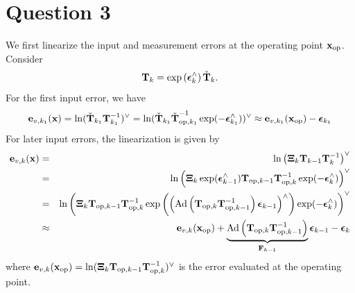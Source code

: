 \documentclass[a4paper]{article}
\begin{document}
\section*{Question 3}

We first linearize the input and measurement errors at the operating point $\bm{\mathbf{x}}_{\text{op}}$. 
Consider 
\begin{equation}
    \bm{\mathbf{T}}_k = \exp\left( \bm{\mathbf{\epsilon}}_k^\wedge \right) \check{\bm{\mathbf{T}}}_k.
\end{equation}
For the first input error, we have
\begin{equation}
    \bm{\mathbf{e}}_{v, k_1}(\bm{\mathbf{x}}) = \ln (\check{\bm{\mathbf{T}}}_{k_1} \bm{\mathbf{T}}^{-1}_{k_1})^\vee = \ln (\check{\bm{\mathbf{T}}}_{k_1} \check{\bm{\mathbf{T}}}^{-1}_{\text{op},k_1} \exp(-\bm{\mathbf{\epsilon}}_{k_1}^\wedge))^\vee \approx \bm{\mathbf{e}}_{v, k_1}(\bm{\mathbf{x}}_{\text{op}}) - \bm{\mathbf{\epsilon}}_{k_1}
\end{equation}
For later input errors, the linearization is given by
\begin{eqnarray}
    \bm{\mathbf{e}}_{v, k}(\bm{\mathbf{x}}) 
     &=& \ln \left(\bm{\mathbf{\Xi}}_k \bm{\mathbf{T}}_{k-1} \bm{\mathbf{T}}_k^{-1}\right)^\vee \\
     &=& \ln \left(\bm{\mathbf{\Xi}}_k \exp (\bm{\mathbf{\epsilon}}_{k-1}^\wedge)\bm{\mathbf{T}}_{\text{op}, k-1} \bm{\mathbf{T}}_{\text{op}, k}^{-1} \exp (-\bm{\mathbf{\epsilon}}_{k}^\wedge) \right)^\vee \\
    &=& \ln \left(\bm{\mathbf{\Xi}}_k \bm{\mathbf{T}}_{\text{op}, k-1} \bm{\mathbf{T}}_{\text{op},k}^{-1} \exp\left( \left( \text{Ad}\left( \bm{\mathbf{T}}_{\text{op}, k} \bm{\mathbf{T}}_{\text{op}, k-1}^{-1}  \right) \bm{\mathbf{\epsilon}}_{k-1} \right)^{\wedge} \right) \exp (-\bm{\mathbf{\epsilon}}_{k}^\wedge) \right)^\vee \\
    &\approx& \bm{\mathbf{e}}_{v, k}(\bm{\mathbf{x}}_{\text{op}}) + \underbrace{\text{Ad}\left( \bm{\mathbf{T}}_{\text{op}, k} \bm{\mathbf{T}}^{-1}_{\text{op}, k-1} \right)}_{\bm{\mathbf{F}}_{k-1}} \bm{\mathbf{\epsilon}}_{k-1} - \bm{\mathbf{\epsilon}}_{k}
\end{eqnarray}
where $\bm{\mathbf{e}}_{v, k}(\bm{\mathbf{x}}_{\text{op}}) = \ln (\bm{\mathbf{\Xi}}_k \bm{\mathbf{T}}_{\text{op},k-1} \bm{\mathbf{T}}_{\text{op},k}^{-1})^\vee$ is the error evaluated at the operating point.
\end{document}
